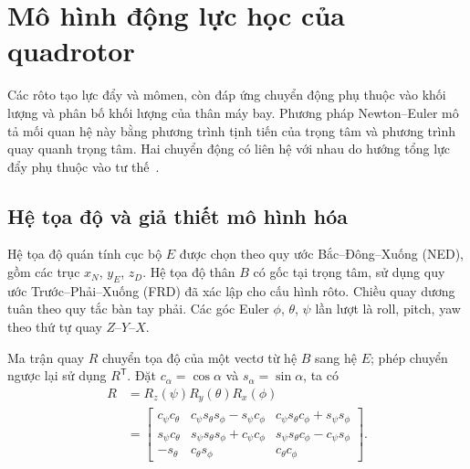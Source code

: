 \section{Mô hình động lực học của quadrotor}
\label{sec:background-dynamics}

Các rôto tạo lực đẩy và mômen, còn đáp ứng chuyển động phụ thuộc vào khối lượng và phân bố khối lượng của thân máy bay. Phương pháp Newton--Euler mô tả mối quan hệ này bằng phương trình tịnh tiến của trọng tâm và phương trình quay quanh trọng tâm. Hai chuyển động có liên hệ với nhau do hướng tổng lực đẩy phụ thuộc vào tư thế~\cite{bouabdallah2004design,chovancova2014mathematical}.

\subsection{Hệ tọa độ và giả thiết mô hình hóa}

Hệ tọa độ quán tính cục bộ $E$ được chọn theo quy ước Bắc--Đông--Xuống (NED), gồm các trục $x_N$, $y_E$, $z_D$. Hệ tọa độ thân $B$ có gốc tại trọng tâm, sử dụng quy ước Trước--Phải--Xuống (FRD) đã xác lập cho cấu hình rôto. Chiều quay dương tuân theo quy tắc bàn tay phải. Các góc Euler $\phi$, $\theta$, $\psi$ lần lượt là roll, pitch, yaw theo thứ tự quay $Z$--$Y$--$X$.

Ma trận quay $R$ chuyển tọa độ của một vectơ từ hệ $B$ sang hệ $E$; phép chuyển ngược lại sử dụng $R^{\mathsf T}$. Đặt $c_\alpha=\cos\alpha$ và $s_\alpha=\sin\alpha$, ta có
\begin{equation}
	\begin{aligned}
		R & =R_z(\psi)R_y(\theta)R_x(\phi)                                                                 \\
		  & =\begin{bmatrix}
			     c_\psi c_\theta & c_\psi s_\theta s_\phi-s_\psi c_\phi & c_\psi s_\theta c_\phi+s_\psi s_\phi \\
			     s_\psi c_\theta & s_\psi s_\theta s_\phi+c_\psi c_\phi & s_\psi s_\theta c_\phi-c_\psi s_\phi \\
			     -s_\theta       & c_\theta s_\phi                      & c_\theta c_\phi
		     \end{bmatrix}.
	\end{aligned}
	\label{eq:background-rotation-matrix}
\end{equation}

